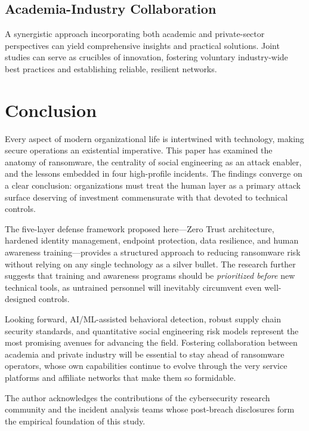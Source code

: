 \documentclass[sigconf,nonacm]{acmart}
\begin{document}
\subsection{Academia-Industry Collaboration}

A synergistic approach incorporating both academic and private-sector perspectives can
yield comprehensive insights and practical solutions. Joint studies can serve as
crucibles of innovation, fostering voluntary industry-wide best practices and
establishing reliable, resilient networks.

\section{Conclusion}

Every aspect of modern organizational life is intertwined with technology, making secure
operations an existential imperative. This paper has examined the anatomy of ransomware,
the centrality of social engineering as an attack enabler, and the lessons embedded in
four high-profile incidents. The findings converge on a clear conclusion: organizations
must treat the human layer as a primary attack surface deserving of investment
commensurate with that devoted to technical controls.

The five-layer defense framework proposed here---Zero Trust architecture, hardened
identity management, endpoint protection, data resilience, and human awareness
training---provides a structured approach to reducing ransomware risk without relying
on any single technology as a silver bullet. The research further suggests that training
and awareness programs should be \emph{prioritized before} new technical tools, as
untrained personnel will inevitably circumvent even well-designed controls.

Looking forward, AI/ML-assisted behavioral detection, robust supply chain security
standards, and quantitative social engineering risk models represent the most promising
avenues for advancing the field. Fostering collaboration between academia and private
industry will be essential to stay ahead of ransomware operators, whose own capabilities
continue to evolve through the very service platforms and affiliate networks that make
them so formidable.

\begin{acks}
The author acknowledges the contributions of the cybersecurity research community
and the incident analysis teams whose post-breach disclosures form the empirical
foundation of this study.
\end{acks}
\end{document}
